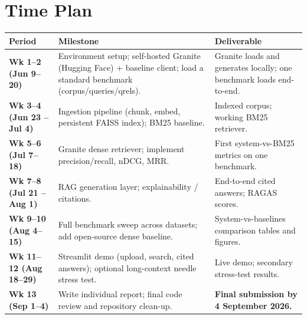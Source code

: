 \section{Time Plan}

\begin{center}
\renewcommand{\arraystretch}{1.35}
\begin{tabular}{@{} >{\bfseries}p{3.2cm} p{5.8cm} p{5cm} @{}}
\toprule
\textbf{Period} & \textbf{Milestone} & \textbf{Deliverable} \\
\midrule
Wk 1--2 \newline (Jun 9--20) &
  Environment setup; self-hosted Granite (Hugging Face) + baseline client; load
  a standard benchmark (corpus/queries/qrels). &
  Granite loads and generates locally; one benchmark loads end-to-end. \\

Wk 3--4 \newline (Jun 23 -- Jul 4) &
  Ingestion pipeline (chunk, embed, persistent FAISS index); BM25 baseline. &
  Indexed corpus; working BM25 retriever. \\

Wk 5--6 \newline (Jul 7--18) &
  Granite dense retriever; implement precision/recall, nDCG, MRR. &
  First system-vs-BM25 metrics on one benchmark. \\

Wk 7--8 \newline (Jul 21 -- Aug 1) &
  RAG generation layer; explainability / citations. &
  End-to-end cited answers; RAGAS scores. \\

Wk 9--10 \newline (Aug 4--15) &
  Full benchmark sweep across datasets; add open-source dense baseline. &
  System-vs-baselines comparison tables and figures. \\

Wk 11--12 \newline (Aug 18--29) &
  Streamlit demo (upload, search, cited answers); optional long-context
  needle stress test. &
  Live demo; secondary stress-test results. \\

Wk 13 \newline (Sep 1--4) &
  Write individual report; final code review and repository clean-up. &
  \textbf{Final submission by 4 September 2026.} \\
\bottomrule
\end{tabular}
\end{center}
